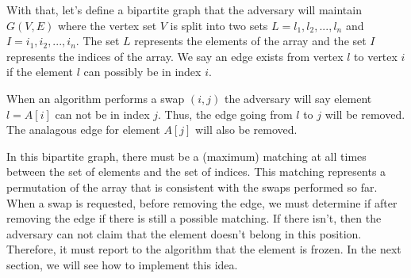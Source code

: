\documentclass{article}
\begin{document}
With that, let's define a bipartite graph that
the adversary will maintain $G(V, E)$ where
the vertex set $V$ is split into two sets $L = {l_1, l_2, ..., l_n}$ and $I = {i_1, i_2, ..., i_n}$.
The set $L$ represents the elements of the array and the set $I$ represents the indices of the array.
We say an edge exists from vertex $l$ to vertex $i$ if the element $l$ can possibly be in index $i$.

When an algorithm performs a swap $(i, j)$ the adversary will say element $l = A[i]$ can not be in index $j$.
Thus, the edge going from $l$ to $j$ will be removed. The analagous edge for element $A[j]$ will also be removed.

In this bipartite graph, there must be a (maximum) matching at all times between the set of elements and the set
of indices. This matching represents a permutation of the array that is consistent with the swaps
performed so far. When a swap is requested, before removing the edge,
we must determine if after removing the edge if there is still a possible matching. If there isn't, then the adversary
can not claim that the element doesn't belong in this position. Therefore, it must report to the algorithm that
the element is frozen. In the next section, we will see how to implement this idea.
\end{document}
